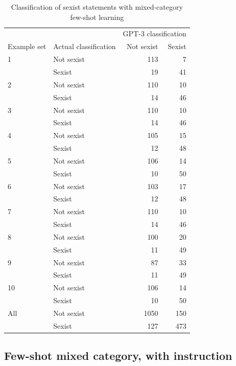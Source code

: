 \documentclass[12pt,]{article}
\begin{document}
\begin{table}[!h]

\caption{\label{tab:fewshotmixed-sexism}Classification of sexist statements with mixed-category few-shot learning}
\centering
\fontsize{8}{10}\selectfont
\begin{tabular}[t]{llrr}
\toprule
\multicolumn{2}{c}{ } & \multicolumn{2}{c}{GPT-3 classification} \\
\cmidrule(l{3pt}r{3pt}){3-4}
Example set & Actual classification & Not sexist & Sexist\\
\midrule
1 & Not sexist & 113 & 7\\
 & Sexist & 19 & 41\\
\midrule
2 & Not sexist & 110 & 10\\
 & Sexist & 14 & \vphantom{2} 46\\
\midrule
3 & Not sexist & 110 & 10\\
 & Sexist & 14 & \vphantom{1} 46\\
\midrule
4 & Not sexist & 105 & 15\\
 & Sexist & 12 & \vphantom{1} 48\\
\midrule
5 & Not sexist & 106 & 14\\
 & Sexist & 10 & \vphantom{1} 50\\
\midrule
6 & Not sexist & 103 & 17\\
 & Sexist & 12 & 48\\
\midrule
7 & Not sexist & 110 & 10\\
 & Sexist & 14 & 46\\
\midrule
8 & Not sexist & 100 & 20\\
 & Sexist & 11 & \vphantom{1} 49\\
\midrule
9 & Not sexist & 87 & 33\\
 & Sexist & 11 & 49\\
\midrule
10 & Not sexist & 106 & 14\\
 & Sexist & 10 & 50\\
\midrule
All & Not sexist & 1050 & 150\\
 & Sexist & 127 & 473\\
\bottomrule
\end{tabular}
\end{table}

\newpage

\hypertarget{appendxbmuxedubstryctub}{%
\subsection{Few-shot mixed category, with instruction}\label{appendxbmuxedubstryctub}}
\end{document}
